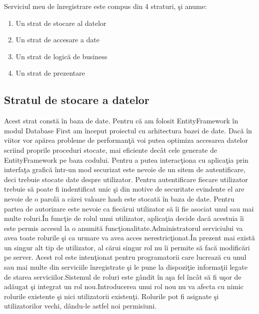 \documentclass[a4paper,12pt]{report}
\begin{document}
Serviciul meu de \^inregistrare este compus din 4 straturi, \c si anume:
\begin{enumerate}
	\item Un strat de stocare al datelor
	\item Un strat de accesare a date
	\item Un strat de logic\u a de business
	\item Un strat de prezentare
\end{enumerate}

\subsection{Stratul de stocare a datelor}

Acest strat const\u a \^in baza de date.
Pentru c\u a am folosit EntityFramework \^in modul Database First am \^inceput proiectul cu arhitectura
bazei de date. Dac\u a \^in viitor vor ap\u area probleme de performan\c t\u a voi putea optimiza accesarea datelor
scriind proprile proceduri stocate, mai eficiente dec\^at cele generate de EntityFramework pe baza codului.
Pentru a putea interac\c tiona cu aplica\c tia prin interfa\c ta grafic\u a \^intr-un mod securizat este nevoie 
de un sitem de autentificare, deci trebuie stocate date despre utilizator. Pentru autentificare fiecare utilizator
trebuie s\u a poate fi indentificat unic \c si din motive de securitate evindente el are nevoie de o parol\u a
a c\u arei valoare hash este stocat\u a \^in baza de date. Pentru partea de autorizare este nevoie ca fiec\u arui 
utilizator s\u a \^ii fie asociat unul sau mai multe roluri.\^In func\c tie de rolul unui utilizator, aplica\c tia decide
dac\u a acestuia \^ii este permis accesul la o anumit\u a func\c tionalitate.Administratorul serviciului
va avea toate rolurile \c si ca urmare va avea acces nerestric\c tionat.\^In prezent  mai exist\u a un singur alt tip
de utilizator, al c\u arui singur  rol nu \^ii permite s\u a fac\u a modific\u ari pe server. Acest rol este inten\c tionat
pentru programatorii care lucreaz\u a cu unul sau mai multe din serviciile \^inregistrate \c si le pune la dispozi\c tie 
informa\c tii legate de starea serviciilor.Sistemul de roluri este g\^andit \^in a\c sa fel \^inc\^at  s\u a fi u\c sor 
de ad\u augat \c si integrat un rol nou.Introducerea unui rol nou nu va afecta cu nimic rolurile existente \c si nici
utilizatorii existen\c ti. Rolurile pot fi asignate \c si utilizatorilor vechi, d\^andu-le astfel noi permisiuni.
\end{document}
